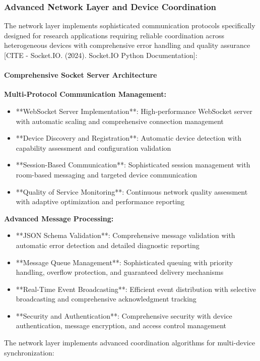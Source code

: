 \documentclass[12pt,a4paper]{report}
\begin{document}
\subsubsection{Advanced Network Layer and Device Coordination}

The network layer implements sophisticated communication protocols specifically designed for research applications
requiring reliable coordination across heterogeneous devices with comprehensive error handling and quality
assurance [CITE - Socket.IO. (2024). Socket.IO Python Documentation]:

\paragraph{Comprehensive Socket Server Architecture}

\textbf{Multi-Protocol Communication Management:}

\begin{itemize}
\item **WebSocket Server Implementation**: High-performance WebSocket server with automatic scaling and comprehensive
  connection management
\item **Device Discovery and Registration**: Automatic device detection with capability assessment and configuration
  validation
\item **Session-Based Communication**: Sophisticated session management with room-based messaging and targeted device
  communication
\item **Quality of Service Monitoring**: Continuous network quality assessment with adaptive optimization and performance
  reporting

\end{itemize}
\textbf{Advanced Message Processing:}

\begin{itemize}
\item **JSON Schema Validation**: Comprehensive message validation with automatic error detection and detailed diagnostic
  reporting
\item **Message Queue Management**: Sophisticated queuing with priority handling, overflow protection, and guaranteed
  delivery mechanisms
\item **Real-Time Event Broadcasting**: Efficient event distribution with selective broadcasting and comprehensive
  acknowledgment tracking
\item **Security and Authentication**: Comprehensive security with device authentication, message encryption, and access
  control management

\end{itemize}
The network layer implements advanced coordination algorithms for multi-device synchronization:
\end{document}
